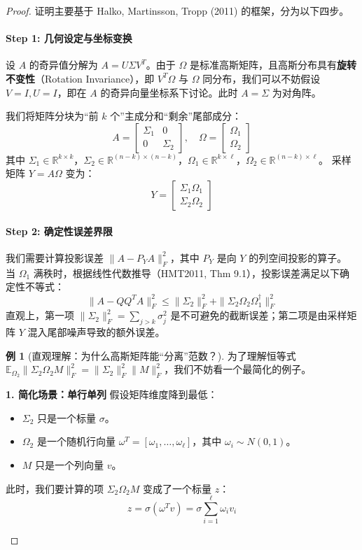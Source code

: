 \documentclass[11pt,a4paper]{ctexart}
\theoremstyle{definition}
\newtheorem{example}[theorem]{例}
\theoremstyle{remark}
\begin{document}
\begin{proof}
证明主要基于 Halko, Martinsson, Tropp (2011) 的框架，分为以下四步。

\paragraph{Step 1: 几何设定与坐标变换}
设 $A$ 的奇异值分解为 $A = U \Sigma V^T$。由于 $\Omega$ 是标准高斯矩阵，且高斯分布具有\textbf{旋转不变性}（Rotation Invariance），即 $V^T \Omega$ 与 $\Omega$ 同分布，我们可以不妨假设 $V=I, U=I$，即在 $A$ 的奇异向量坐标系下讨论。此时 $A = \Sigma$ 为对角阵。

我们将矩阵分块为“前 $k$ 个”主成分和“剩余”尾部成分：
\[
A = \begin{bmatrix} \Sigma_1 & 0 \\ 0 & \Sigma_2 \end{bmatrix}, \quad
\Omega = \begin{bmatrix} \Omega_1 \\ \Omega_2 \end{bmatrix}
\]
其中 $\Sigma_1 \in \mathbb{R}^{k \times k}$，$\Sigma_2 \in \mathbb{R}^{(n-k) \times (n-k)}$，$\Omega_1 \in \mathbb{R}^{k \times \ell}$，$\Omega_2 \in \mathbb{R}^{(n-k) \times \ell}$。
采样矩阵 $Y = A\Omega$ 变为：
\[
Y = \begin{bmatrix} \Sigma_1 \Omega_1 \\ \Sigma_2 \Omega_2 \end{bmatrix}
\]

\paragraph{Step 2: 确定性误差界限}
我们需要计算投影误差 $\| A - P_Y A \|_F^2$，其中 $P_Y$ 是向 $Y$ 的列空间投影的算子。
当 $\Omega_1$ 满秩时，根据线性代数推导（HMT2011, Thm 9.1），投影误差满足以下确定性不等式：
\[
\| A - Q Q^T A \|_F^2 \leq \| \Sigma_2 \|_F^2 + \| \Sigma_2 \Omega_2 \Omega_1^\dagger \|_F^2
\]
直观上，第一项 $\| \Sigma_2 \|_F^2 = \sum_{j>k} \sigma_j^2$ 是不可避免的截断误差；第二项是由采样矩阵 $Y$ 混入尾部噪声导致的额外误差。


\begin{example}[直观理解：为什么高斯矩阵能“分离”范数？]
    为了理解恒等式 $\mathbb{E}_{\Omega_2} \| \Sigma_2 \Omega_2 M \|_F^2 = \| \Sigma_2 \|_F^2 \| M \|_F^2$，我们不妨看一个最简化的例子。

    \textbf{1. 简化场景：单行单列}
    假设矩阵维度降到最低：
    \begin{itemize}
        \item $\Sigma_2$ 只是一个标量 $\sigma$。
        \item $\Omega_2$ 是一个随机行向量 $\omega^T = [\omega_1, \dots, \omega_\ell]$，其中 $\omega_i \sim N(0,1)$。
        \item $M$ 只是一个列向量 $v$。
    \end{itemize}
    此时，我们要计算的项 $\Sigma_2 \Omega_2 M$ 变成了一个标量 $z$：
    \[
    z = \sigma (\omega^T v) = \sigma \sum_{i=1}^\ell \omega_i v_i
    \]
    

\end{example}
\end{proof}
\end{document}

